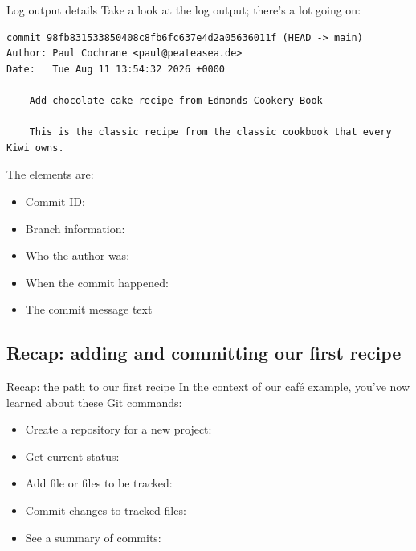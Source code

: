 \begin{frame}[fragile]{Log output details}
    Take a look at the log output; there's a lot going on:
    \begin{verbatim}
commit 98fb831533850408c8fb6fc637e4d2a05636011f (HEAD -> main)
Author: Paul Cochrane <paul@peateasea.de>
Date:   Tue Aug 11 13:54:32 2026 +0000

    Add chocolate cake recipe from Edmonds Cookery Book

    This is the classic recipe from the classic cookbook that every Kiwi owns.
    \end{verbatim}

    The elements are:
    \begin{itemize}
        \item Commit ID: 
        \item Branch information: 
        \item Who the author was: 
        \item When the commit happened: 
        \item The commit message text
    \end{itemize}
\end{frame}

\subsection{Recap: adding and committing our first recipe}

\begin{frame}[fragile]{Recap: the path to our first recipe}
    In the context of our café example, you've now learned about these Git
    commands:
    \begin{itemize}
        \item Create a repository for a new project: 
        \item Get current status: 
        \item Add file or files to be tracked: 
        \item Commit changes to tracked files: 
        \item See a summary of commits: 
    \end{itemize}
\end{frame}

